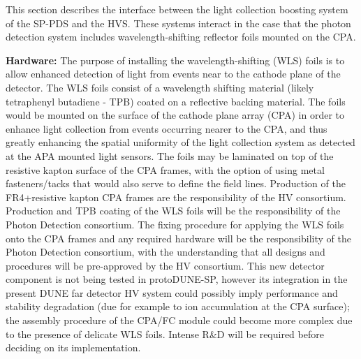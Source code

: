 

This section describes the interface between the light collection boosting system of the SP-PDS  and the HVS. These systems interact in the case that the photon detection system includes wavelength-shifting reflector foils mounted on the CPA.

\textbf{Hardware: }The purpose of installing the wavelength-shifting (WLS) foils is to allow enhanced detection of light from events near to the cathode plane of the detector. The WLS foils consist of a wavelength shifting material (likely tetraphenyl butadiene - TPB) coated on a reflective backing material. The foils would be mounted on the surface of the cathode plane array (CPA) in order to enhance light collection from events occurring nearer to the CPA, and thus greatly enhancing the spatial uniformity of the light collection system as detected at the APA mounted light sensors. The foils may be laminated on top of the resistive kapton surface of the CPA frames, with the option of using metal fasteners/tacks that would also serve to define the field lines. Production of the FR4+resistive kapton CPA frames are the responsibility of the HV consortium. Production and TPB coating of the WLS foils will be the responsibility of the Photon Detection consortium. The fixing procedure for applying the WLS foils onto the CPA frames and any required hardware will be the responsibility of the Photon Detection consortium, with the understanding that all designs and procedures will be pre-approved by the HV consortium. This new detector component is not being tested in protoDUNE-SP, however its integration in the present DUNE far detector HV system could possibly imply performance and stability degradation (due for example to ion accumulation at the CPA surface); the assembly procedure of the CPA/FC module could become more complex due to the presence of delicate WLS foils. Intense R\&D will be required before deciding on its implementation.

